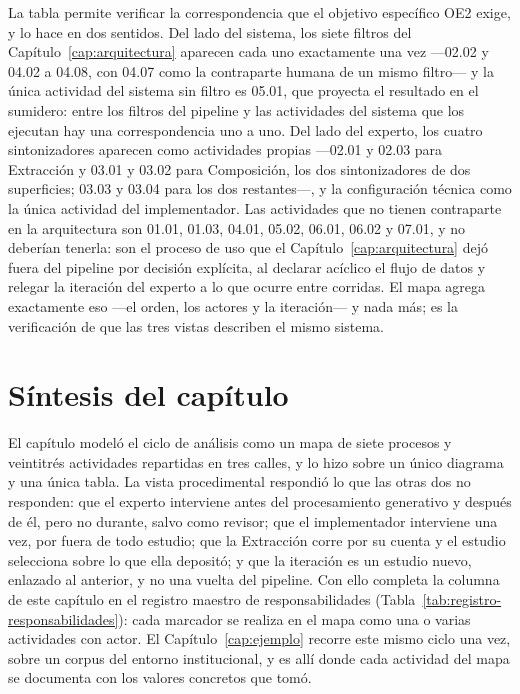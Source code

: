 \documentclass[12pt]{report}
\begin{document}
La tabla permite verificar la correspondencia que el objetivo específico OE2 exige, y lo hace en dos sentidos. Del lado del sistema, los siete filtros del Capítulo~\ref{cap:arquitectura} aparecen cada uno exactamente una vez ---02.02 y 04.02 a 04.08, con 04.07 como la contraparte humana de un mismo filtro--- y la única actividad del sistema sin filtro es 05.01, que proyecta el resultado en el sumidero: entre los filtros del pipeline y las actividades del sistema que los ejecutan hay una correspondencia uno a uno. Del lado del experto, los cuatro sintonizadores aparecen como actividades propias ---02.01 y 02.03 para Extracción y 03.01 y 03.02 para Composición, los dos sintonizadores de dos superficies; 03.03 y 03.04 para los dos restantes---, y la configuración técnica como la única actividad del implementador. Las actividades que no tienen contraparte en la arquitectura son 01.01, 01.03, 04.01, 05.02, 06.01, 06.02 y 07.01, y no deberían tenerla: son el proceso de uso que el Capítulo~\ref{cap:arquitectura} dejó fuera del pipeline por decisión explícita, al declarar acíclico el flujo de datos y relegar la iteración del experto a lo que ocurre entre corridas. El mapa agrega exactamente eso ---el orden, los actores y la iteración--- y nada más; es la verificación de que las tres vistas describen el mismo sistema.

\section{Síntesis del capítulo}
\label{sec:proc-sintesis}

El capítulo modeló el ciclo de análisis como un mapa de siete procesos y veintitrés actividades repartidas en tres calles, y lo hizo sobre un único diagrama y una única tabla. La vista procedimental respondió lo que las otras dos no responden: que el experto interviene antes del procesamiento generativo y después de él, pero no durante, salvo como revisor; que el implementador interviene una vez, por fuera de todo estudio; que la Extracción corre por su cuenta y el estudio selecciona sobre lo que ella depositó; y que la iteración es un estudio nuevo, enlazado al anterior, y no una vuelta del pipeline. Con ello completa la columna de este capítulo en el registro maestro de responsabilidades (Tabla~\ref{tab:registro-responsabilidades}): cada marcador se realiza en el mapa como una o varias actividades con actor. El Capítulo~\ref{cap:ejemplo} recorre este mismo ciclo una vez, sobre un corpus del entorno institucional, y es allí donde cada actividad del mapa se documenta con los valores concretos que tomó.
\end{document}
